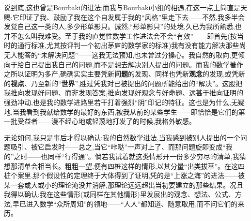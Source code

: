 说到底,这也曾是Bourbaki的进法;而我与Bourbaki小组的相遇,在这一点上简直是天赐:它印证了我、鼓励了我\dmark{}在这个自发属于我的“风格”里走下去——不然,我多半会发觉自己这一类的人,多少形单影只。诚然,“形单影只”的处境,久已为我所熟悉,也并不怎么叫我难受。至于我的直觉性数学工作进法会不会“有效”——即首先(按当时的通行标准,尤其按评判一个初出茅庐的数学家的标准)我有没有能力解决那些尚无人能答的“未解决问题”——这我无法预知,也未曾过分操心。我自然的取向,更倾向于给自己提出我自己的问题,而不是想去解决别人提出的问题。而我的数学著作之所以证明为多产,确确实实主要凭新\textbf{问题}的发现、同样也凭新\textbf{观念}的发现,或凭新的\textbf{视点}、乃至新的“\textbf{世界}”,胜过凭我对已被提出的问题所能给出的“解决”。这股把我推向发现好问题、而非发现答案,推向发现好观念与好命题、远甚于推向证明的强劲冲动,也是我的数学进路里若干打着强烈“阴”印记的特征。这也是为什么,无疑地,当我看到我献给数学的最好的东西,被我从前的某些学生——即恰恰是它们的第一批受益者——漫不经心地或轻蔑地打发了的时候,我格外敏感。

无论如何,我只是事后才得以确认:我的自然数学进法,当我感到被别人提出的一个问题吸引、被它启发时——总之,当它“咔哒”一声对上了、而那问题旋即变成“我的”之时——也同样“行得通”。倘若我试着就这类情形开一份多少穷尽的清单,我猜想那清单会相当长。粗粗一望,便有四桩这样的情形,以其分量“出类拔萃”。在这\dmark{}四桩个案里,那个假设性的定理终于大体得到了证明,凭的是“上涨之海”的进法——被某一套或大或小的理论淹没并消解,那理论远远超出当初要建立的那些结果。况且我得以确认:我在这些情形(或同样在其他情形)里发展出的观念、想法、公式、方法,早已进入数学“众所周知”的领地——“人人”都知道、随意取用,而不问它们的来历。

